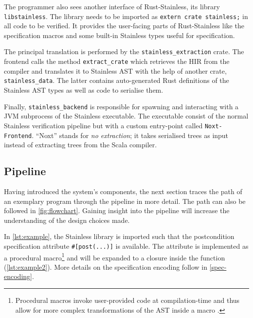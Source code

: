 The programmer also sees another interface of Rust-Stainless, its library
\lstinline!libstainless!. The library needs to be imported as
\passthrough{\lstinline!extern crate stainless;!} in all code to be verified. It
provides the user-facing parts of Rust-Stainless like the specification macros
and some built-in Stainless types useful for specification.

The principal translation is performed by the \lstinline!stainless_extraction!
crate. The frontend calls the method \lstinline!extract_crate! which retrieves
the HIR from the compiler and translates it to Stainless AST with the help of
another crate, \lstinline!stainless_data!. The latter contains auto-generated
Rust definitions of the Stainless AST types as well as code to serialise them.

Finally, \lstinline!stainless_backend! is responsible for spawning and
interacting with a JVM subprocess of the Stainless executable. The executable
consist of the normal Stainless verification pipeline but with a custom
entry-point called \lstinline!Noxt-Frontend!. ``Noxt'' stands for \emph{no
extraction}; it takes serialised trees as input instead of extracting trees from
the Scala compiler.

\subsection{Pipeline}
\label{sec:pipeline}

Having introduced the system's components, the next section traces the path of
an exemplary program through the pipeline in more detail. The path can also be
followed in \autoref{fig:flowchart}. Gaining insight into the pipeline will
increase the understanding of the design choices made.

In \autoref{lst:example}, the Stainless library is imported such that the
postcondition specification attribute \lstinline!#[post(...)]! is available. The
attribute is implemented as a procedural macro\footnote{Procedural macros invoke
user-provided code at compilation-time and thus allow for more complex
transformations of the AST inside a macro \cite[section ``Procedural
Macros'']{rustref}.} and will be expanded to a closure inside the function
(\autoref{lst:example2}). More details on the specification encoding follow in
\autoref{spec-encoding}.

